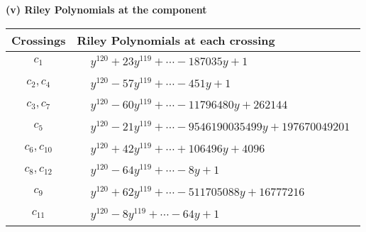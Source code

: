 \documentclass[1p]{elsarticle_modified}
\theoremstyle{definition}
\begin{document}
\newpage\renewcommand{\arraystretch}{1}
\flushleft \textbf{(v) Riley Polynomials at the component}\newline \\
\begin{tabular}{m{50pt}|m{274pt}}
Crossings & \hspace{64pt}Riley Polynomials at each crossing \\
\hline $$\begin{aligned}c_{1}\end{aligned}$$&$\begin{aligned}
&y^{120}+23 y^{119}+\cdots-187035 y+1
\end{aligned}$\\
\hline $$\begin{aligned}c_{2},c_{4}\end{aligned}$$&$\begin{aligned}
&y^{120}-57 y^{119}+\cdots-451 y+1
\end{aligned}$\\
\hline $$\begin{aligned}c_{3},c_{7}\end{aligned}$$&$\begin{aligned}
&y^{120}-60 y^{119}+\cdots-11796480 y+262144
\end{aligned}$\\
\hline $$\begin{aligned}c_{5}\end{aligned}$$&$\begin{aligned}
&y^{120}-21 y^{119}+\cdots-9546190035499 y+197670049201
\end{aligned}$\\
\hline $$\begin{aligned}c_{6},c_{10}\end{aligned}$$&$\begin{aligned}
&y^{120}+42 y^{119}+\cdots+106496 y+4096
\end{aligned}$\\
\hline $$\begin{aligned}c_{8},c_{12}\end{aligned}$$&$\begin{aligned}
&y^{120}-64 y^{119}+\cdots-8 y+1
\end{aligned}$\\
\hline $$\begin{aligned}c_{9}\end{aligned}$$&$\begin{aligned}
&y^{120}+62 y^{119}+\cdots-511705088 y+16777216
\end{aligned}$\\
\hline $$\begin{aligned}c_{11}\end{aligned}$$&$\begin{aligned}
&y^{120}-8 y^{119}+\cdots-64 y+1
\end{aligned}$\\
\hline
\end{tabular}\\~\\
\end{document}
